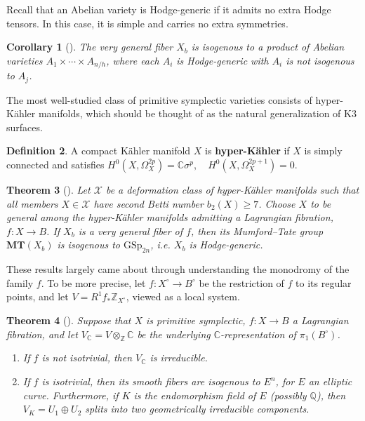 \documentclass[12pt]{amsart}
\newcommand{\Q}{\mathbb{Q}}
\newcommand{\C}{\mathbb{C}}
\newcommand{\Z}{\mathbb{Z}}
\newtheorem{theorem}{Theorem}[section]
\newtheorem{corollary}[theorem]{Corollary}
\theoremstyle{definition}
\newtheorem{definition}[theorem]{Definition}
\numberwithin{equation}{section}
\begin{document}
Recall that an Abelian variety is Hodge-generic if it admits no extra Hodge tensors. 
In this case, it is simple and carries no extra symmetries.

\begin{corollary}[\cite{varvak26}] \label{fiber-structure}
    The very general fiber \(X_b\) is isogenous to a product of Abelian varieties 
    \(A_1 \times \cdots \times A_{n/h}\), where each \(A_i\) is Hodge-generic with
    \(A_i\) is not isogenous to \(A_j\).
\end{corollary}

The most well-studied class of primitive symplectic varieties consists of hyper-K\"ahler 
manifolds, which should be thought of as the natural generalization of K3 surfaces.

\begin{definition}
    A compact K\"ahler manifold \(X\) is {\bf hyper-K\"ahler} if \(X\) is simply connected 
    and satisfies \(H^0(X, \Omega_X^{2p}) = \C \sigma^p,\quad H^0(X, \Omega_X^{2p+1}) = 0\).
\end{definition}


\begin{theorem}[\cite{varvak26}] \label{general-mt}
    Let \(\mathcal{X}\) be a deformation class of hyper-K\"ahler manifolds such that 
    all members \(X \in \mathcal{X}\) have second Betti number \(b_2(X) \geq 7\).
    Choose \(X\) to be general among the hyper-K\"ahler manifolds admitting a Lagrangian 
    fibration, \(f: X \to B\). If \(X_b\) is a very general fiber of \(f\), 
    then its Mumford--Tate group \(\mathbf{MT}(X_b)\) is isogenous to  
    \(\mathrm{GSp}_{2n}\), i.e. \(X_b\) is Hodge-generic.
\end{theorem}

These results largely came about through understanding the monodromy of the family \(f\). 
To be more precise, let \(f: X^\circ \to B^\circ\) be the restriction of \(f\) to 
its regular points, and let \(V = R^1 f_* \Z_{X^\circ}\), viewed as a local system. 

\begin{theorem}[\cite{varvak25}]
    Suppose that \(X\) is primitive symplectic, \(f: X \to B\) a Lagrangian fibration, and let
    \(V_\C = V \otimes_\Z \C\) be the underlying \(\C\)-representation of 
    \(\pi_1(B^\circ)\). 
    \begin{enumerate}
        \item If \(f\) is not isotrivial, then \(V_\C\) is irreducible.
        \item If \(f\) is isotrivial, then its smooth fibers are isogenous to 
        \(E^n\), for \(E\) an elliptic curve. Furthermore, if \(K\) is the endomorphism 
        field of \(E\) (possibly \(\Q\)), then \(V_K = U_1 \oplus U_2\) splits into 
        two geometrically irreducible components.
    \end{enumerate}
\end{theorem}
\end{document}
